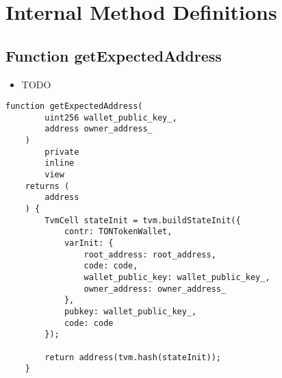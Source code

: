 \section{Internal Method Definitions}


\subsection{Function getExpectedAddress}

\noindent\begin{itemize}
\item TODO
\end{itemize}

\begin{lstlisting}[firstnumber=620]
    function getExpectedAddress(
        uint256 wallet_public_key_,
        address owner_address_
    )
        private
        inline
        view
    returns (
        address
    ) {
        TvmCell stateInit = tvm.buildStateInit({
            contr: TONTokenWallet,
            varInit: {
                root_address: root_address,
                code: code,
                wallet_public_key: wallet_public_key_,
                owner_address: owner_address_
            },
            pubkey: wallet_public_key_,
            code: code
        });

        return address(tvm.hash(stateInit));
    }
\end{lstlisting}
